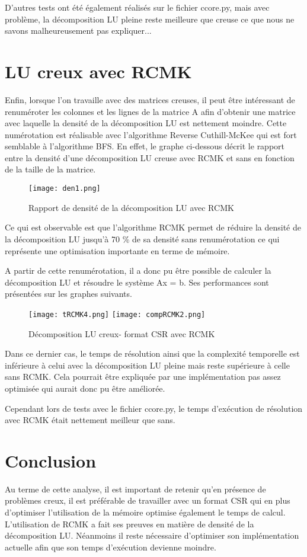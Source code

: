 \documentclass[11pt]{article}
\begin{document}
D'autres tests ont été également réalisés sur le fichier ccore.py, mais avec problème, la décomposition LU pleine reste meilleure que creuse ce que nous ne savons malheureusement pas expliquer...
\section{LU creux avec RCMK}
Enfin, lorsque l'on travaille avec des matrices creuses, il peut être intéressant de renuméroter les colonnes et les lignes de la matrice A afin d'obtenir une matrice avec laquelle la densité de la décomposition LU est nettement moindre. Cette numérotation est réalisable avec l'algorithme Reverse Cuthill-McKee qui est fort semblable à l'algorithme BFS. En effet, le graphe ci-dessous décrit le rapport entre la densité d'une décomposition LU creuse avec RCMK et sans en fonction de la taille de la matrice. 
\begin{figure}[h!]
    \centering
    \texttt{[image: den1.png]}
    \caption{Rapport de densité de la décomposition LU avec RCMK}
\end{figure}

Ce qui est observable est que l'algorithme RCMK permet de réduire la densité de la décomposition LU jusqu'à 70 \% de sa densité sans renumérotation ce qui représente une optimisation importante en terme de mémoire.

A partir de cette renumérotation, il a donc pu être possible de calculer la décomposition LU et résoudre le système Ax = b. Ses performances sont présentées sur les graphes suivants.
\begin{figure}[h!]
    \centering
    \texttt{[image: tRCMK4.png]}
    \texttt{[image: compRCMK2.png]}
    \caption{Décomposition LU creux- format CSR avec RCMK}
\end{figure}

Dans ce dernier cas, le temps de résolution ainsi que la complexité temporelle est inférieure à celui avec la décomposition LU pleine mais reste supérieure à celle sans RCMK. Cela pourrait être expliquée par une implémentation pas assez optimisée qui aurait donc pu être améliorée.

Cependant lors de tests avec le fichier ccore.py, le temps d'exécution de résolution avec RCMK était nettement meilleur que sans. 

\section{Conclusion}
Au terme de cette analyse, il est important de retenir qu'en présence de problèmes creux, il est préférable de travailler avec un format CSR qui en plus d'optimiser l'utilisation de la mémoire optimise également le temps de calcul. L'utilisation de RCMK a fait ses preuves en matière de densité de la décomposition LU. Néanmoins il reste nécessaire d'optimiser son implémentation actuelle afin que son temps d'exécution devienne moindre.
\end{document}
